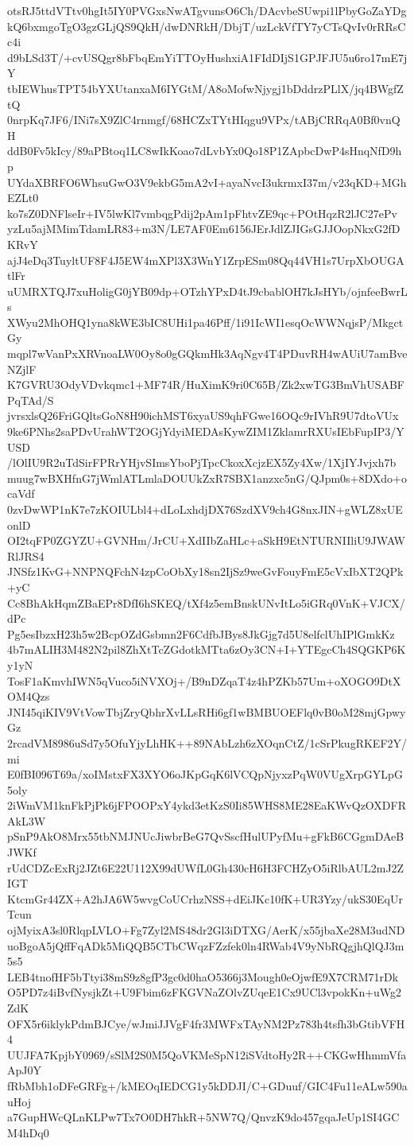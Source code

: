 otsRJ5ttdVTtv0hgIt5IY0PVGxsNwATgvunsO6Ch/DAcvbeSUwpi1lPbyGoZaYDg
kQ6bxmgoTgO3gzGLjQS9QkH/dwDNRkH/DbjT/uzLckVfTY7yCTsQvIv0rRRsCc4i
d9bLSd3T/+cvUSQgr8bFbqEmYiTTOyHushxiA1FIdDIjS1GPJFJU5u6ro17mE7jY
tbIEWhusTPT54bYXUtanxaM6IYGtM/A8oMofwNjygj1bDddrzPLlX/jq4BWgfZtQ
0nrpKq7JF6/INi7sX9ZlC4rnmgf/68HCZxTYtHIqgu9VPx/tABjCRRqA0Bf0vnQH
ddB0Fv5kIcy/89aPBtoq1LC8wIkKoao7dLvbYx0Qo18P1ZApbcDwP4sHnqNfD9hp
UYdaXBRFO6WhsuGwO3V9ekbG5mA2vI+ayaNvcI3ukrmxI37m/v23qKD+MGhEZLt0
ko7sZ0DNFlseIr+IV5lwKl7vmbqgPdij2pAm1pFhtvZE9qc+POtHqzR2lJC27ePv
yzLu5ajMMimTdamLR83+m3N/LE7AF0Em6156JErJdlZJIGsGJJOopNkxG2fDKRvY
ajJ4eDq3TuyltUF8F4J5EW4mXPl3X3WnY1ZrpESm08Qq44VH1s7UrpXbOUGAtlFr
uUMRXTQJ7xuHoligG0jYB09dp+OTzhYPxD4tJ9cbablOH7kJsHYb/ojnfeeBwrLs
XWyu2MhOHQ1yna8kWE3bIC8UHi1pa46Pff/1i91IcWI1esqOcWWNqjsP/MkgctGy
mqpl7wVanPxXRVnoaLW0Oy8o0gGQkmHk3AqNgv4T4PDuvRH4wAUiU7amBveNZjlF
K7GVRU3OdyVDvkqmc1+MF74R/HuXimK9ri0C65B/Zk2xwTG3BmVhUSABFPqTAd/S
jvrsxlsQ26FriGQltsGoN8H90ichMST6xyaUS9qhFGwe16OQc9rIVhR9U7dtoVUx
9ke6PNhs2saPDvUrahWT2OGjYdyiMEDAsKywZIM1ZklamrRXUsIEbFupIP3/YUSD
/lOlIU9R2uTdSirFPRrYHjvSImsYboPjTpcCkoxXcjzEX5Zy4Xw/1XjIYJvjxh7b
muug7wBXHfnG7jWmlATLmlaDOUUkZxR7SBX1anzxc5nG/QJpm0s+8DXdo+ocaVdf
0zvDwWP1nK7e7zKOIULbl4+dLoLxhdjDX76SzdXV9ch4G8nxJIN+gWLZ8xUEonlD
OI2tqFP0ZGYZU+GVNHm/JrCU+XdIIbZaHLc+aSkH9EtNTURNIIliU9JWAWRlJRS4
JNSfz1KvG+NNPNQFchN4zpCoObXy18sn2IjSz9weGvFouyFmE5cVxIbXT2QPk+yC
Cc8BhAkHqmZBaEPr8DfI6hSKEQ/tXf4z5emBnskUNvItLo5iGRq0VnK+VJCX/dPc
Pg5esIbzxH23h5w2BcpOZdGsbmn2F6CdfbJBys8JkGjg7d5U8elfclUhIPlGmkKz
4b7mALIH3M482N2pil8ZhXtTcZGdotkMTta6zOy3CN+I+YTEgcCh4SQGKP6Ky1yN
TosF1aKmvhIWN5qVuco5iNVXOj+/B9nDZqaT4z4hPZKb57Um+oXOGO9DtXOM4Qzs
JNI45qiKIV9VtVowTbjZryQbhrXvLLsRHi6gf1wBMBUOEFlq0vB0oM28mjGpwyGz
2rcadVM8986uSd7y5OfuYjyLhHK++89NAbLzh6zXOqnCtZ/1cSrPkugRKEF2Y/mi
E0fBI096T69a/xoIMstxFX3XYO6oJKpGqK6lVCQpNjyxzPqW0VUgXrpGYLpG5oly
2iWmVM1knFkPjPk6jFPOOPxY4ykd3etKzS0Ii85WHS8ME28EaKWvQzOXDFRAkL3W
pSnP9AkO8Mrx55tbNMJNUcJiwbrBeG7QvSscfHulUPyfMu+gFkB6CGgmDAeBJWKf
rUdCDZcExRj2JZt6E22U112X99dUWfL0Gh430cH6H3FCHZyO5iRlbAUL2mJ2ZIGT
KtcmGr44ZX+A2hJA6W5wvgCoUCrhzNSS+dEiJKc10fK+UR3Yzy/ukS30EqUrTcun
ojMyixA3sl0RlqpLVLO+Fg7Zyl2MS48dr2Gl3iDTXG/AerK/x55jbaXe28M3udND
uoBgoA5jQffFqADk5MiQQB5CTbCWqzFZzfek0ln4RWab4V9yNbRQgjhQlQJ3m5s5
LEB4tnofHF5bTtyi38mS9z8gfP3gc0d0haO5366j3Mough0eOjwfE9X7CRM71rDk
O5PD7z4iBvfNysjkZt+U9Fbim6zFKGVNaZOlvZUqeE1Cx9UCl3vpokKn+uWg2ZdK
OFX5r6iklykPdmBJCye/wJmiJJVgF4fr3MWFxTAyNM2Pz783h4tsfh3bGtibVFH4
UUJFA7KpjbY0969/sSlM2S0M5QoVKMeSpN12iSVdtoHy2R++CKGwHhmmVfaApJ0Y
fRbMbh1oDFeGRFg+/kMEOqIEDCG1y5kDDJI/C+GDuuf/GIC4Fu11eALw590auHoj
a7GupHWcQLnKLPw7Tx7O0DH7hkR+5NW7Q/QnvzK9do457gqaJeUp1SI4GCM4hDq0
